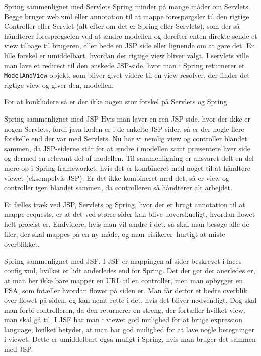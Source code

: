 \documentclass[a4paper,10pt]{article}
\begin{document}
Spring sammenlignet med Servlets
Spring minder på mange måder om Servlets. Begge bruger web.xml eller annotation til at mappe forespørgsler til den rigtige Controller eller Servlet (alt efter om det er Spring eller Servlets), som der så håndterer forespørgselen ved at ændre modellen og derefter enten direkte sende et view tilbage til brugeren, eller bede en JSP side eller lignende om at gøre det. En lille forskel er umiddelbart, hvordan det rigtige view bliver valgt. I servlets ville man lave et redirect til den ønskede JSP-side, hvor man i Spring returnerer et \texttt{ModelAndView} objekt, som bliver givet videre til en view resolver, der finder det rigtige view og giver den, modellen.

For at konkludere så er der ikke nogen stor forskel på Servlets og Spring.

Spring sammenlignet med JSP
Hvis man laver en ren JSP side, hvor der ikke er nogen Servlets, fordi java koden er i de enkelte JSP-sider, så er der nogle flere forskelle end der var med Servlets. Nu har vi nemlig view og controller blandet sammen, da JSP-siderne står for at ændre i modellen samt præsentere hver side og dermed en relevant del af modellen. Til sammenligning er ansvaret delt en del mere op i Spring frameworket, hvis det er kombineret med noget til at håndtere viewet (eksempelvis JSP). Er det ikke kombineret med det, så er view og controller igen blandet sammen, da controlleren så håndterer alt arbejdet.

Et fælles træk ved JSP, Servlets og Spring, hvor der er brugt annotation til at mappe requests, er at det ved større sider kan blive uoverskueligt, hvordan flowet helt præcist er. Endvidere, hvis man vil ændre i det, så skal man besøge alle de filer, der skal mappes på en ny måde, og man risikerer hurtigt at miste overblikket.


Spring sammenlignet med JSF.
I JSF er mappingen af sider beskrevet i faces-config.xml, hvilket er lidt anderledes end for Spring. Det der gør det anerledes er, at man her ikke bare mapper en URL til en controller, men man opbygger en FSA, som fotæller hvordan flowet på siden er. Man får derfor et bedre overblik over flowet på siden, og kan nemt rette i det, hvis det bliver nødvendigt. Dog skal man forbi controlleren, da den returnerer en streng, der fortæller hvilket view, man skal gå til. I JSF har man i viewet god mulighed for at bruge expression language, hvilket betyder, at man har god mulighed for at lave nogle beregninger i viewet. Dette er umiddelbart også muligt i Spring, hvis man bruger det sammen med JSP.
\end{document}
